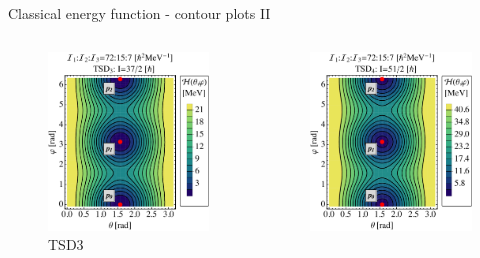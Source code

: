 \documentclass{beamer}
\begin{document}
\begin{frame}{Classical energy function - contour plots II}
    \begin{columns} 
\begin{figure}
    \centering
    \includegraphics[scale=0.3]{figs/contour3_optimal.pdf}
    \caption{TSD3}
\end{figure}
\begin{figure}
    \centering
    \includegraphics[scale=0.3]{figs/contour4_optimal.pdf}

\end{figure}
\end{columns}
\end{frame}
\end{document}
